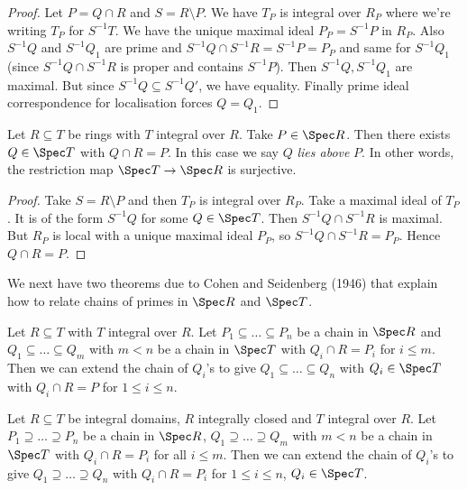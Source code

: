 \documentclass[a4paper]{article}
\begin{document}
\begin{proof}
  Let \(P = Q \cap R\) and \(S = R \setminus P\). We have \(T_P\) is integral over \(R_P\) where we're writing \(T_P\) for \(S^{-1}T\). We have the unique maximal ideal \(P_P = S^{-1}P\) in \(R_P\). Also \(S^{-1}Q\) and \(S^{-1}Q_1\) are prime and \(S^{-1}Q \cap S^{-1}R = S^{-1}P = P_P\) and same for \(S^{-1}Q_1\) (since \(S^{-1}Q \cap S^{-1}R\) is proper and contains \(S^{-1}P\)). Then \(S^{-1}Q, S^{-1}Q_1\) are maximal. But since \(S^{-1}Q \subseteq S^{-1}Q'\), we have equality. Finally prime ideal correspondence for localisation forces \(Q = Q_1\).
\end{proof}

\begin{theorem}
  Let \(R \subseteq T\) be rings with \(T\) integral over \(R\). Take \(P \in \Spec R\). Then there exists \(Q \in \Spec T\) with \(Q \cap R = P\). In this case we say \(Q\) \emph{lies above} \(P\). In other words, the restriction map \(\Spec T \to \Spec R\) is surjective.
\end{theorem}

\begin{proof}
  Take \(S = R \setminus P\) and then \(T_P\) is integral over \(R_P\). Take a maximal ideal of \(T_P\). It is of the form \(S^{-1}Q\) for some \(Q \in \Spec T\). Then \(S^{-1}Q \cap S^{-1}R\) is maximal. But \(R_P\) is local with a unique maximal ideal \(P_P\), so \(S^{-1}Q \cap S^{-1}R = P_P\). Hence \(Q \cap R = P\).
\end{proof}

We next have two theorems due to Cohen and Seidenberg (1946) that explain how to relate chains of primes in \(\Spec R\) and \(\Spec T\).

\begin{theorem}
  \label{thm:going up}
  Let \(R \subseteq T\) with \(T\) integral over \(R\). Let \(P_1 \subseteq \dots \subseteq P_n\) be a chain in \(\Spec R\) and \(Q_1 \subseteq \dots \subseteq Q_m\) with \(m < n\) be a chain in \(\Spec T\) with \(Q_i \cap R = P_i\) for \(i \leq m\). Then we can extend the chain of \(Q_i\)'s to give \(Q_1 \subseteq \dots \subseteq Q_n\) with \(Q_i \in \Spec T\) with \(Q_i \cap R = P\) for \(1 \leq i \leq n\).
\end{theorem}

\begin{theorem}
  \label{thm:going down}
  Let \(R \subseteq T\) be integral domains, \(R\) integrally closed and \(T\) integral over \(R\). Let \(P_1 \supseteq \dots \supseteq P_n\) be a chain in \(\Spec R\), \(Q_1 \supseteq \dots \supseteq Q_m\) with \(m < n\) be a chain in \(\Spec T\) with \(Q_i \cap R = P_i\) for all \(i \leq m\). Then we can extend the chain of \(Q_i\)'s to give \(Q_1 \supseteq \dots \supseteq Q_n\) with \(Q_i \cap R = P_i\) for \(1 \leq i \leq n\), \(Q_i \in \Spec T\).
\end{theorem}
\end{document}
